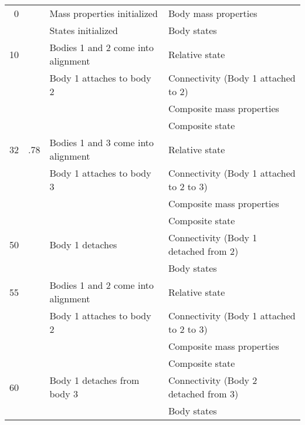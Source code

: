 \begin{table}[htp]
\begin{tabular}{||r@{}l|p{2.4in}|p{2.7in}|}
0 && Mass properties initialized & Body mass properties \\
 && States initialized & Body states \\[6pt]
10 && Bodies 1 and 2 come into alignment & Relative state \\
 && Body 1 attaches to body 2 & Connectivity (Body 1 attached to 2) \\
 &&& Composite mass properties \\
 &&& Composite state \\[6pt]
32&.78 & Bodies 1 and 3 come into alignment & Relative state \\
 && Body 1 attaches to body 3 & Connectivity (Body 1 attached to 2 to 3) \\
 &&& Composite mass properties \\
 &&& Composite state \\[6pt]
50 && Body 1 detaches & Connectivity (Body 1 detached from 2) \\
 &&& Body states \\[6pt]
55 && Bodies 1 and 2 come into alignment & Relative state \\
 && Body 1 attaches to body 2 & Connectivity (Body 1 attached to 2 to 3) \\
 &&& Composite mass properties \\
 &&& Composite state \\[6pt]
60 && Body 1 detaches from body 3 & Connectivity (Body 2 detached from 3) \\
 &&& Body states \\
\hline
\end{tabular}
\end{table}
